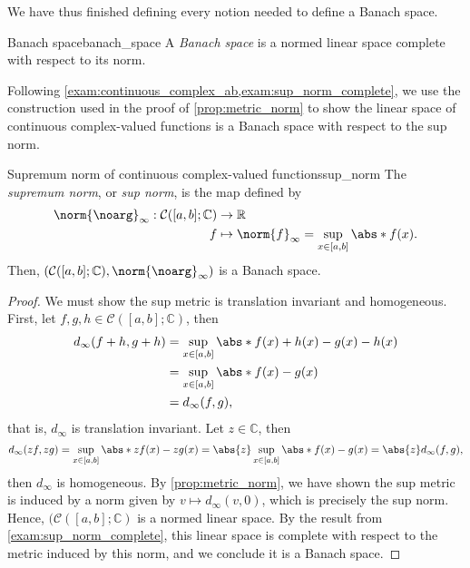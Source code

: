 We have thus finished defining every notion needed to define a Banach space.
\begin{definition}{Banach space}{banach_space}
    A \emph{Banach space} is a normed linear space complete with respect to its norm.
\end{definition}

Following \cref{exam:continuous_complex_ab,exam:sup_norm_complete}, we use the construction used in the proof of \cref{prop:metric_norm} to show the linear space of continuous complex-valued functions is a Banach space with respect to the sup norm.
\begin{example}{Supremum norm of continuous complex-valued functions}{sup_norm}
    The \emph{supremum norm}, or \emph{sup norm}, is the map defined by
    \begin{align*}
        \norm{\noarg}_{\infty} : \mathcal{C}([a,b];\mathbb{C}) &\to \mathbb{R}\\
                                                             f &\mapsto \norm{f}_\infty = \sup_{x \in [a,b]}\abs*{f(x)}.
    \end{align*}
    Then, \(\left(\mathcal{C}([a,b];\mathbb{C}), \norm{\noarg}_\infty\right)\) is a Banach space.
\end{example}
\begin{proof}
    We must show the sup metric is translation invariant and homogeneous. First, let \(f, g, h \in \mathcal{C}([a,b];\mathbb{C})\), then
    \begin{align*}
        d_\infty(f + h, g + h) &= \sup_{x \in [a,b]}\abs*{f(x) + h(x) - g(x) - h(x)} \\&= \sup_{x \in [a,b]} \abs*{f(x) - g(x)} \\&= d_\infty(f, g),
    \end{align*}
    that is, \(d_\infty\) is translation invariant. Let \(z \in \mathbb{C}\), then
    \begin{equation*}
        d_\infty(zf, zg) = \sup_{x\in[a,b]}\abs*{zf(x) - zg(x)} = \abs{z} \sup_{x\in[a,b]}\abs*{f(x) - g(x)} =  \abs{z} d_\infty(f,g),
    \end{equation*}
    then \(d_\infty\) is homogeneous. By \cref{prop:metric_norm}, we have shown the sup metric is induced by a norm given by \(v \mapsto d_\infty(v, 0)\), which is precisely the sup norm. Hence, \((\mathcal{C}([a,b];\mathbb{C})\) is a normed linear space. By the result from \cref{exam:sup_norm_complete}, this linear space is complete with respect to the metric induced by this norm, and we conclude it is a Banach space.
\end{proof}

